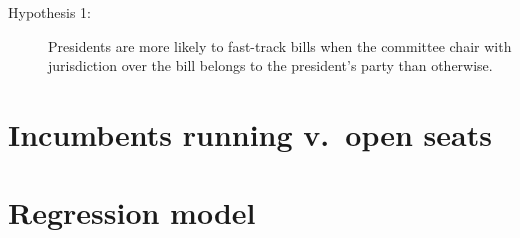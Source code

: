 \documentclass[letter,12pt]{article}
\begin{document}
\begin{description}
  \item [Hypothesis 1:] Presidents are more likely to fast-track bills when the committee chair with jurisdiction over the bill  belongs to the president's party than otherwise.
\end{description}

\section{Incumbents running v.\ open seats}



\section{Regression model}
\end{document}
